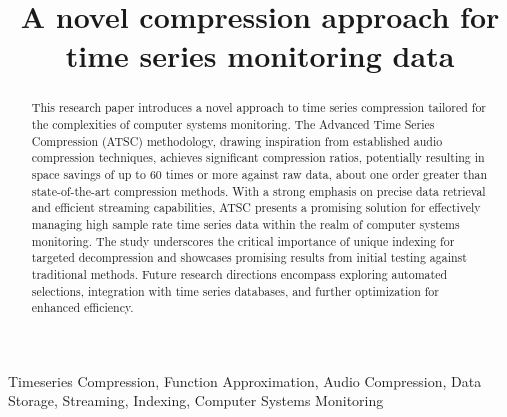 \documentclass[conference]{IEEEtran}
\begin{document}
\title{A novel compression approach for time series monitoring data\\}

\author{
\and
{}
\and
{}
}

\maketitle

\begin{abstract}
    This research paper introduces a novel approach to time series compression tailored for the complexities of computer systems monitoring.
    The Advanced Time Series Compression (ATSC) methodology, drawing inspiration from established audio compression techniques, achieves significant compression ratios, potentially resulting in space savings of up to 60 times or more against raw data, about one order greater than state-of-the-art compression methods.
    With a strong emphasis on precise data retrieval and efficient streaming capabilities, ATSC presents a promising solution for effectively managing high sample rate time series data within the realm of computer systems monitoring.
    The study underscores the critical importance of unique indexing for targeted decompression and showcases promising results from initial testing against traditional methods.
    Future research directions encompass exploring automated selections, integration with time series databases, and further optimization for enhanced efficiency.
\end{abstract}
\vspace{5pt}
\begin{IEEEkeywords}
Timeseries Compression, Function Approximation, Audio Compression, Data Storage, Streaming, Indexing, Computer Systems Monitoring
\end{IEEEkeywords}
\end{document}
